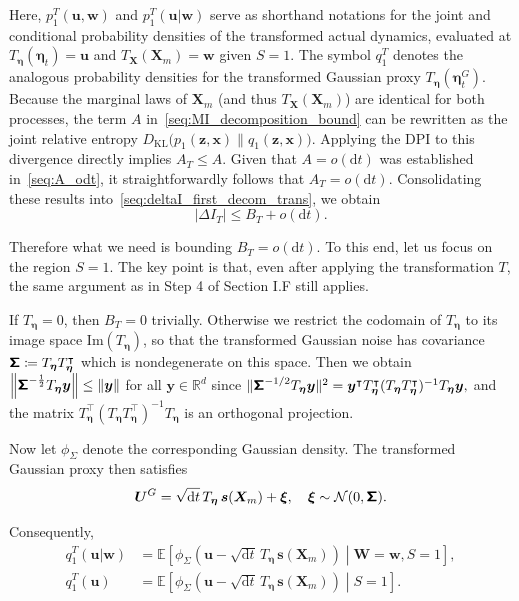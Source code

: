 Here, $p_1^T(\bm u, \bm w)$ and $p_1^T(\bm u | \bm w)$ serve as shorthand notations for the joint and conditional probability densities of the transformed actual dynamics, evaluated at $T_{\bm\eta}(\bm\eta_t)=\bm u$ and $T_{\bm X}(\bm X_m)=\bm w$ given $S=1$. The symbol $q_1^T$ denotes the analogous probability densities for the transformed Gaussian proxy $T_{\bm\eta}(\bm\eta_t^G)$. 
Because the marginal laws of $\bm X_m$ (and thus $T_{\bm X}(\bm X_m)$) are identical for both processes, the term $A$ in~\eqref{seq:MI_decomposition_bound} can be rewritten as the joint relative entropy $D_{\mathrm{KL}}\big(p_1(\bm z,\bm x)\|q_1(\bm z,\bm x)\big)$. Applying the DPI to this divergence directly implies $A_T \le A$. Given that $A=o(\mathrm dt)$ was established in~\eqref{seq:A_odt}, it straightforwardly follows that $A_T=o(\mathrm dt)$. Consolidating these results into~\eqref{seq:deltaI_first_decom_trans}, we obtain
\[
    |\Delta I_T|\leq B_T+o(\mathrm dt).
\]

Therefore what we need is bounding $B_T=o(\mathrm dt)$. To this end, let us focus on the region $S=1$. The key point is that, even after applying the transformation $T$, the same argument as in Step 4 of Section I.F still applies.

If $T_{\bm\eta}=0$, then $B_T=0$ trivially. Otherwise we restrict the codomain of $T_{\bm\eta}$ to its image space $\mathrm{Im}(T_{\bm\eta})$, so that the transformed Gaussian noise has covariance $\boldsymbol{\mathsf{\Sigma}}\coloneq T_{\bm\eta}T_{\bm\eta}^\intercal$
which is nondegenerate on this space. Then we obtain 
$
    \left\|\boldsymbol{\mathsf{\Sigma}}^{-\frac{1}{2}}T_{\bm\eta}\bm y\right\|\leq\|\bm y\|
$ for all $\bm y\in\mathbb R^d$ since
$
    \| \boldsymbol{\mathsf{\Sigma}}^{-1/2}T_{\bm\eta}\bm y\|^2
    =\bm y^\intercal T_{\bm\eta}^\intercal (T_{\bm\eta}T_{\bm\eta}^\intercal)^{-1}
    T_{\bm\eta}\bm y,
$
and the matrix $T_{\bm\eta}^\intercal(T_{\bm\eta}T_{\bm\eta}^\intercal)^{-1}T_{\bm\eta}$ is an orthogonal projection.

Now let $\phi_{\Sigma}$ denote the corresponding Gaussian density. The transformed Gaussian proxy then satisfies
\begin{equation}
    \bm U^G=\sqrt{\mathrm dt}\,T_{\bm\eta}\,\bm s(\bm X_m)+\bm\xi,
    \quad\bm\xi\sim\mathcal N(0,\boldsymbol{\mathsf{\Sigma}}).
    \label{seq:U_G_gaussian}
\end{equation}

Consequently,
\begin{equation*}
    \begin{aligned}
        q_1^T(\bm u|\bm w)&=\mathbb E\!\left[
        \phi_\Sigma\left(\bm u-\sqrt{\mathrm dt}\,T_{\bm\eta}\,\bm s(\bm X_m)\right)
        \middle|
        \bm W=\bm w,S=1\right],
        \\
        q_1^T(\bm u)&=\mathbb E\!\left[
        \phi_\Sigma\left(\bm u-\sqrt{\mathrm dt}\,T_{\bm\eta}\,\bm s(\bm X_m)\right)
        \middle|
        S=1\right].
    \end{aligned}
\end{equation*}

